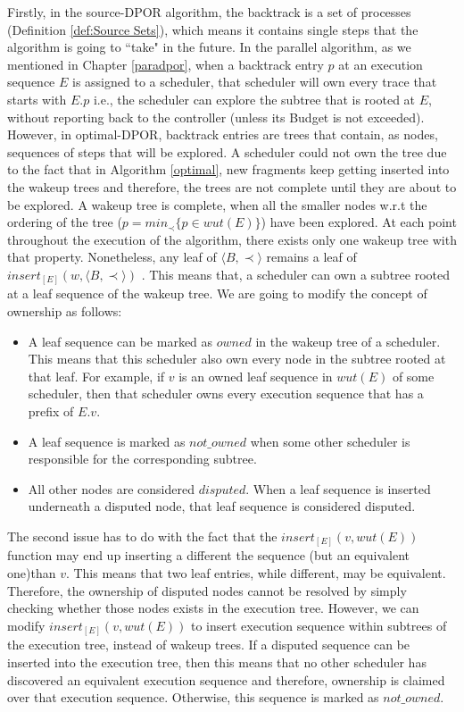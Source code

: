 Firstly, in the source-DPOR algorithm, the backtrack is a set of processes (Definition \ref{def:Source Sets}), which means it contains single steps that the algorithm is going to ``take" in the future. In the parallel algorithm, as we mentioned in Chapter \ref{paradpor}, when a backtrack entry $p$ at an execution sequence $E$ is assigned to a scheduler, that scheduler will own every trace that starts with $E.p$ i.e., the scheduler can explore the subtree that is rooted at $E$, without reporting back to the controller (unless its Budget is not exceeded). 
However, in optimal-DPOR, backtrack entries are trees that contain, as nodes, sequences of steps that will be explored. A scheduler could not own the tree due to the fact that in Algorithm \ref{optimal}, new fragments keep getting inserted into the wakeup trees and therefore, the trees are not complete until they are about to be explored. A wakeup tree is complete, when all the smaller nodes w.r.t the ordering of the tree ($p = min_{\prec}\{ p \in wut(E)\}$) have been explored. At each point throughout the execution of the algorithm, there exists only one wakeup tree with that property. 
Nonetheless, any leaf of $\langle B , \prec \rangle$ remains a leaf of $insert_{[E]}(w,\langle B , \prec \rangle)$
\cite{AbdullaAronisJohnssonSagonasDPOR2014}. This means that, a scheduler can own a subtree rooted at a leaf sequence of the wakeup tree. We are going to modify the concept of ownership as follows:
\begin{itemize}
\item A leaf sequence can be marked as $owned$ in the wakeup tree of a scheduler. This means that this scheduler also own every node in the subtree rooted at that leaf. For example, if $v$ is an owned leaf sequence in $wut(E)$ of some scheduler, then that scheduler owns every execution sequence that has a prefix of $E.v$.
\item A leaf sequence is marked as $not\_owned$ when some other scheduler is responsible for the corresponding subtree.
\item All other nodes are considered $disputed$. When a leaf sequence is inserted underneath a disputed node, that leaf sequence is considered disputed.
\end{itemize}

The second issue has to do with the fact that the $insert_{[E]}(v,wut(E))$ function may end up
inserting a different the sequence (but an equivalent one)than $v$. This means that two leaf entries, while different,
may be equivalent. Therefore, the ownership of disputed nodes cannot be resolved by simply checking whether those nodes exists in the execution tree.
However, we can modify $insert_{[E]}(v,wut(E))$ to insert execution sequence within subtrees of the execution tree, instead of wakeup trees. If a disputed sequence can be inserted into the execution tree, then this means that no other scheduler has discovered an equivalent execution sequence and therefore, ownership is claimed over that execution sequence. Otherwise, this sequence is marked as $not\_owned$.

